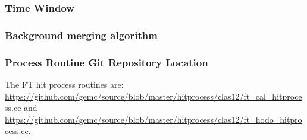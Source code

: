 \subsubsection{Time Window}

\subsubsection{Background merging algorithm}

\subsubsection{Process Routine Git Repository Location}
The FT hit process routines are: \url{https://github.com/gemc/source/blob/master/hitprocess/clas12/ft_cal_hitprocess.cc} and
\url{https://github.com/gemc/source/blob/master/hitprocess/clas12/ft_hodo_hitprocess.cc}.
